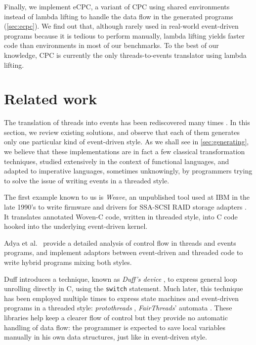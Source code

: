 \documentclass[a4paper]{llncs}
\begin{document}
Finally, we implement eCPC, a variant of CPC using shared environments instead of
lambda lifting to handle the data flow in the generated programs
(\cref{sec:ecpc}).  We find out that, although rarely used in real-world
event-driven programs because it is tedious to perform manually, lambda lifting
yields faster code than environments in most of our benchmarks.  To the best of
our knowledge, CPC is currently the only threads-to-events translator using
lambda lifting.

\section{Related work}
\label{sec:related}

The translation of threads into events has been rediscovered many times
\cite{DBLP:conf/sensys/DunkelsSVA06,DBLP:conf/usenix/KrohnKK07,weave}.  In this
section, we review existing solutions, and observe that each of them generates
only one particular kind of event-driven style.  As we shall see in
\cref{sec:generating}, we believe that these implementations are in fact a few
classical transformation techniques, studied extensively in the context of
functional languages, and adapted to imperative languages, sometimes
unknowingly, by programmers trying to solve the issue of writing events in a
threaded style.

The first example known to us is \emph{Weave}, an unpublished tool used at IBM
in the late 1990's to write firmware and drivers for SSA-SCSI RAID
storage adapters \cite{weave}.  It translates annotated Woven-C code, written in
threaded style, into C code hooked into the underlying event-driven kernel.

Adya et al.\ \cite{DBLP:conf/usenix/AdyaHTBD02} provide a detailed analysis of
control flow in threads and events programs, and implement adaptors between
event-driven and threaded code to write hybrid programs mixing both styles.

Duff introduces a technique, known as \emph{Duff's device} \cite{duff}, to
express general loop unrolling directly in C, using the \texttt{switch}
statement.  Much later, this technique has been employed multiple times to
express state machines and event-driven programs in a threaded style:
\emph{protothreads} \cite{DBLP:conf/sensys/DunkelsSVA06}, \emph{FairThreads}'
automata \cite{DBLP:journals/concurrency/Boussinot06}.  These libraries help
keep a clearer flow of control but they provide no automatic handling of data
flow: the programmer is expected to save local variables manually in his own
data structures, just like in event-driven style.
\end{document}
